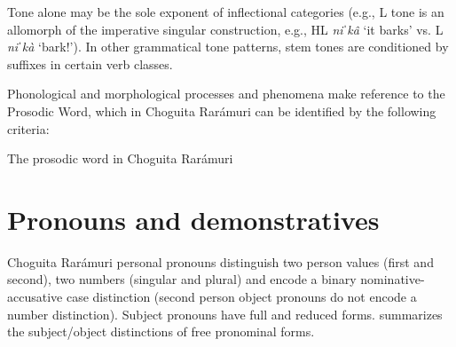 \TabPositions{2cm,4cm,6cm,8cm}

Tone alone may be the sole exponent of inflectional categories (e.g., L tone is an allomorph of the imperative singular construction, e.g., HL \textit{niˈkâ} `it barks' vs. L \textit{niˈkà} `bark!'). In other grammatical tone patterns, stem tones are conditioned by suffixes in certain verb classes.

Phonological and morphological processes and phenomena make reference to the Prosodic Word, which in Choguita Rarámuri can be identified by the following criteria:

\ea\label{ex: prosodic word criteria}
{The prosodic word in Choguita Rarámuri}

    				\z
   				\z

\section{Pronouns and demonstratives}
\label{sec: pronouns and demonstratives}

Choguita Rarámuri personal pronouns distinguish two person values (first and second), two numbers (singular and plural) and encode a binary nominative-accusative case distinction (second person object pronouns do not encode a number distinction). Subject pronouns have full and reduced forms.  summarizes the subject/object distinctions of free pronominal forms.


